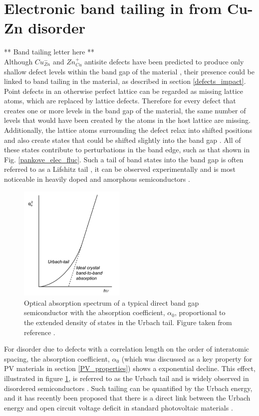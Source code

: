 \documentclass[11pt, twoside]{report}
\begin{document}
\section{Electronic band tailing in {\CZTS} from Cu-Zn disorder}\label{eris_band_tailing}

** Band tailing letter here **\\

Although $Cu_{Zn}^{-}$ and $Zn_{Cu}^{+}$ antisite defects have been predicted to produce only shallow defect levels within the band gap of the material \cite{defects_Chen}, their presence could be linked to band tailing in the material, as described in section \ref{defects_impact}. 
Point defects in an otherwise perfect lattice can be regarded as missing lattice atoms, which are replaced by lattice defects. Therefore for every defect that creates one or more levels in the band gap of the material, the same number of levels that would have been created by the atoms in the host lattice are missing. Additionally, the lattice atoms surrounding the defect relax into shifted positions and also create states that could be shifted slightly into the band gap \cite{thin_film_Boer}. All of these states contribute to perturbations in the band edge, such as that shown in Fig. \ref{pankove_elec_fluc}. Such a tail of band states into the band gap is often referred to as a Lifshitz tail \cite{Lifshitz1964}, it can be observed experimentally and is most noticeable in heavily doped and amorphous semiconductors \cite{thin_film_Boer}. 
\begin{figure}[h!]
  \centering
    \includegraphics[width=0.45\textwidth]{figures/urbach_fig.png}
    \caption{Optical absorption spectrum of a typical direct band gap semiconductor with the absorption coefficient, $\alpha_{0}$, proportional to the extended density of states in the Urbach tail. Figure taken from reference .}
  \label{urbach_fig}
\end{figure}
For disorder due to defects with a correlation length on the order of interatomic spacing, the absorption coefficient, $\alpha_{0}$ (which was discussed as a key property for PV materials in section \ref{PV_properties}) shows a exponential decline. This effect, illustrated in figure \ref{urbach_fig}, is referred to as the Urbach tail \cite{Urbach1953} and is widely observed in disordered semiconductors \cite{thin_film_Boer}. Such tailing can be quantified by the Urbach energy, and it has recently been proposed that there is a direct link between the Urbach energy and open circuit voltage deficit in standard photovoltaic materials \cite{culprit, UrbachE_Voc}.
\end{document}

